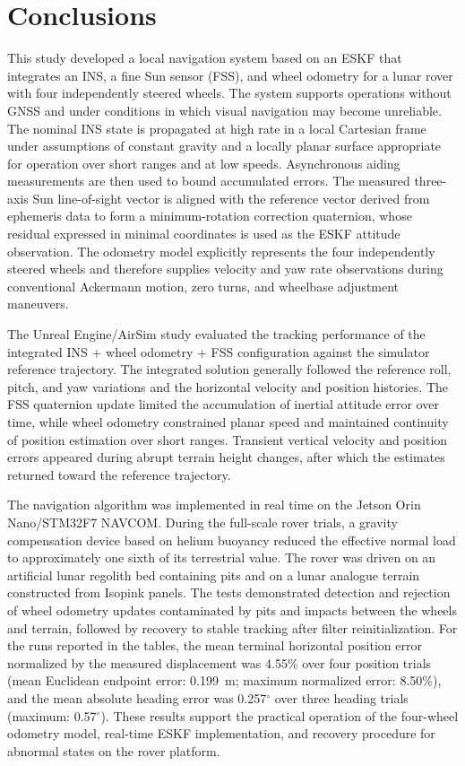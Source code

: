 \documentclass[]{IAC_style}
\begin{document}
\FloatBarrier
\section{Conclusions}

This study developed a local navigation system based on an ESKF that integrates an INS, a fine Sun sensor (FSS), and wheel odometry for a lunar rover with four independently steered wheels. The system supports operations without GNSS and under conditions in which visual navigation may become unreliable. The nominal INS state is propagated at high rate in a local Cartesian frame under assumptions of constant gravity and a locally planar surface appropriate for operation over short ranges and at low speeds. Asynchronous aiding measurements are then used to bound accumulated errors. The measured three-axis Sun line-of-sight vector is aligned with the reference vector derived from ephemeris data to form a minimum-rotation correction quaternion, whose residual expressed in minimal coordinates is used as the ESKF attitude observation. The odometry model explicitly represents the four independently steered wheels and therefore supplies velocity and yaw rate observations during conventional Ackermann motion, zero turns, and wheelbase adjustment maneuvers.

The Unreal Engine/AirSim study evaluated the tracking performance of the integrated INS + wheel odometry + FSS configuration against the simulator reference trajectory. The integrated solution generally followed the reference roll, pitch, and yaw variations and the horizontal velocity and position histories. The FSS quaternion update limited the accumulation of inertial attitude error over time, while wheel odometry constrained planar speed and maintained continuity of position estimation over short ranges. Transient vertical velocity and position errors appeared during abrupt terrain height changes, after which the estimates returned toward the reference trajectory.

The navigation algorithm was implemented in real time on the Jetson Orin Nano/STM32F7 NAVCOM. During the full-scale rover trials, a gravity compensation device based on helium buoyancy reduced the effective normal load to approximately one sixth of its terrestrial value. The rover was driven on an artificial lunar regolith bed containing pits and on a lunar analogue terrain constructed from Isopink panels. The tests demonstrated detection and rejection of wheel odometry updates contaminated by pits and impacts between the wheels and terrain, followed by recovery to stable tracking after filter reinitialization. For the runs reported in the tables, the mean terminal horizontal position error normalized by the measured displacement was 4.55\% over four position trials (mean Euclidean endpoint error: 0.199~m; maximum normalized error: 8.50\%), and the mean absolute heading error was 0.257$^\circ$ over three heading trials (maximum: 0.57$^\circ$). These results support the practical operation of the four-wheel odometry model, real-time ESKF implementation, and recovery procedure for abnormal states on the rover platform.
\end{document}
